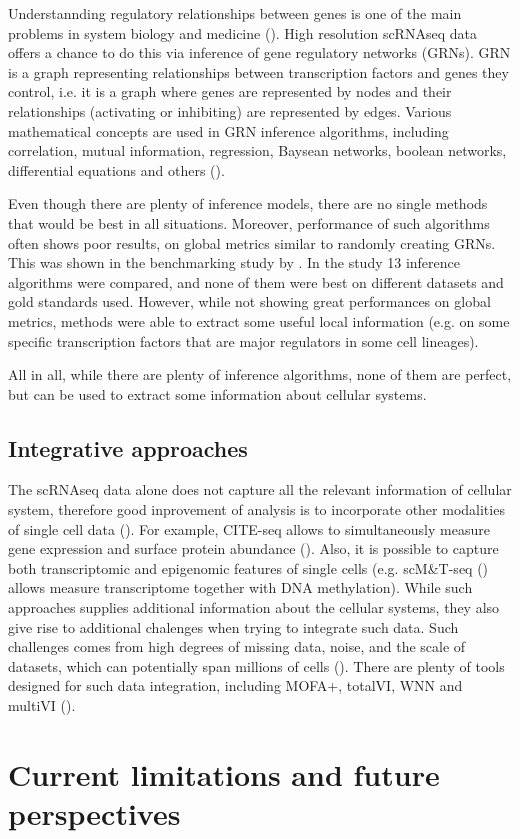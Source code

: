 Understannding regulatory relationships between genes is one of the main problems in system biology and medicine (\cite{Lamoline2024}).
High resolution scRNAseq data offers a chance to do this via inference of gene regulatory networks (GRNs).
GRN is a graph representing relationships between transcription factors and genes they control,
i.e. it is a graph where genes are represented by nodes and their relationships (activating or inhibiting) are represented by edges.
Various mathematical concepts are used in GRN inference algorithms, including
correlation, mutual information, regression, Baysean networks, boolean networks, differential equations and others (\cite{Akers2021}).

Even though there are plenty of inference models, there are no single methods that would be best in all situations.
Moreover, performance of such algorithms often shows poor results, on global metrics similar to randomly creating GRNs.
This was shown in the benchmarking study by \textcite{McCalla2023}.
In the study 13 inference algorithms were compared, and none of them were best on different datasets and gold standards used.
However, while not showing great performances on global metrics, methods were able to extract some useful local information
(e.g. on some specific transcription factors that are major regulators in some cell lineages).

All in all, while there are plenty of inference algorithms, none of them are perfect,
but can be used to extract some information about cellular systems.

\subsection{Integrative approaches}

The scRNAseq data alone does not capture all the relevant information of cellular system,
therefore good inprovement of analysis is to incorporate other modalities of single cell data (\cite{Heumos2023}).
For example, CITE-seq allows to simultaneously measure gene expression and surface protein abundance (\cite{Mercatelli2021}).
Also, it is possible to capture both transcriptomic and epigenomic features of single cells
(e.g. scM\&T-seq (\cite{Angermueller2016}) allows measure transcriptome together with DNA methylation).
While such approaches supplies additional information about the cellular systems,
they also give rise to additional chalenges when trying to integrate such data.
Such challenges comes from high degrees of missing data, noise, and the scale of datasets,
which can potentially span millions of cells (\cite{Argelaguet2020}).
There are plenty of tools designed for such data integration, including MOFA+, totalVI, WNN and multiVI (\cite{Heumos2023}).

\section{Current limitations and future perspectives}


